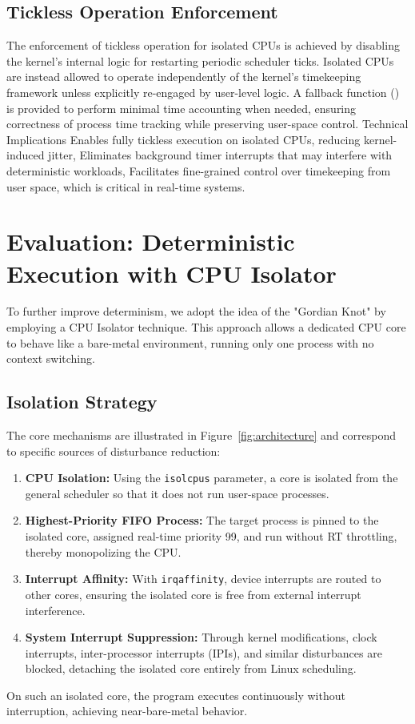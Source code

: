 \documentclass[letterpaper]{article}
\begin{document}
\subsection{Tickless Operation Enforcement}
The enforcement of tickless operation for isolated CPUs is achieved by disabling the kernel's
internal logic for restarting periodic scheduler ticks. Isolated CPUs are instead allowed to operate
independently of the kernel's timekeeping framework unless explicitly re-engaged by user-level
logic.
A fallback function () is provided to perform minimal time accounting when needed, ensuring
correctness of process time tracking while preserving user-space control.
Technical Implications
Enables fully tickless execution on isolated CPUs, reducing kernel-induced jitter,
Eliminates background timer interrupts that may interfere with deterministic workloads,
Facilitates fine-grained control over timekeeping from user space, which is critical in real-time
systems.

\section{Evaluation: Deterministic Execution with CPU Isolator}

To further improve determinism, we adopt the idea of the "Gordian Knot" by employing a CPU
Isolator technique. This approach allows a dedicated CPU core to behave like a bare-metal
environment, running only one process with no context switching.

\subsection{Isolation Strategy}
The core mechanisms are illustrated in Figure~\ref{fig:architecture} and correspond to specific
sources of disturbance reduction:
\begin{enumerate}
    \item \textbf{CPU Isolation:} Using the \texttt{isolcpus} parameter, a core is isolated from the
    general scheduler so that it does not run user-space processes.
    \item \textbf{Highest-Priority FIFO Process:} The target process is pinned to the isolated core,
    assigned real-time priority 99, and run without RT throttling, thereby monopolizing the CPU.
    \item \textbf{Interrupt Affinity:} With \texttt{irqaffinity}, device interrupts are routed to other cores,
    ensuring the isolated core is free from external interrupt interference.
    \item \textbf{System Interrupt Suppression:} Through kernel modifications, clock interrupts,
    inter-processor interrupts (IPIs), and similar disturbances are blocked, detaching the isolated
    core entirely from Linux scheduling.
\end{enumerate}
On such an isolated core, the program executes continuously without interruption, achieving
near-bare-metal behavior.
\end{document}
